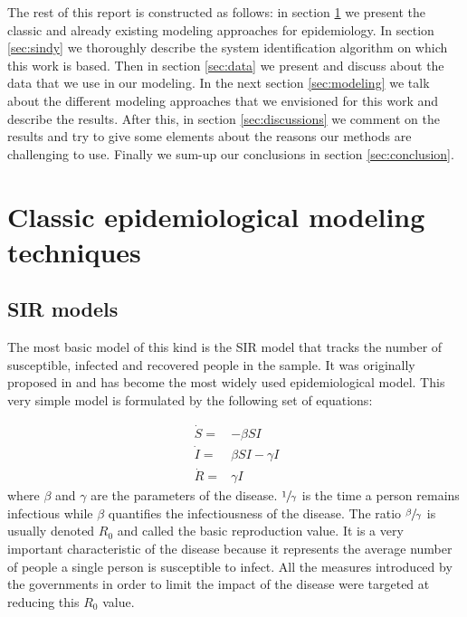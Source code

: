 \documentclass[12pt, letterpaper]{article}
\begin{document}
The rest of this report is constructed as follows: in section \ref{sec:sir} we present the classic and already existing modeling approaches for epidemiology. In section \ref{sec:sindy} we thoroughly describe the system identification algorithm on which this work is based. Then in section \ref{sec:data} we present and discuss about the data that we use in our modeling. In the next section \ref{sec:modeling} we talk about the different modeling approaches that we envisioned for this work and describe the results. After this, in section \ref{sec:discussions} we comment on the results and try to give some elements about the reasons our methods are challenging to use. Finally we sum-up our conclusions in section \ref{sec:conclusion}.

\section{Classic epidemiological modeling techniques}\label{sec:sir}

\subsection{SIR models}

The most basic model of this kind is the SIR model that tracks the number of susceptible, infected and recovered people in the sample. 
It was originally proposed in \cite{sir} and has become the most widely used epidemiological model.
This very simple model is formulated by the following set of equations:

\begin{equation}\label{eq:sir}\
\begin{split}
\dot{S} = &- \beta SI \\
\dot{I} = &\beta SI - \gamma I \\
\dot{R} = & \gamma I
\end{split}
\end{equation}
where $\beta$ and $\gamma$ are the parameters of the disease. 
$\sfrac{1}{\gamma}$ is the time a person remains infectious while $\beta$ quantifies the infectiousness of the disease. 
The ratio $\sfrac{\beta}{\gamma}$ is usually denoted $R_0$ and called the basic reproduction value. 
It is a very important characteristic of the disease because it represents the average number of people a single person is susceptible to infect. 
All the measures introduced by the governments in order to limit the impact of the disease were targeted at reducing this $R_0$ value. 
\end{document}
